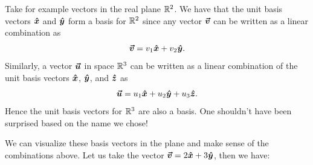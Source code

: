         Take for example vectors in the real plane $\mathbb{R}^2$.  We have that the unit basis vectors $\boldsymbol{\hat{x}}$ and $\boldsymbol{\hat{y}}$ form a basis for $\mathbb{R}^2$ since any vector $\boldsymbol{\boldsymbol{\vec{v}}}$ can be written as a linear combination as 
        \[
        \boldsymbol{\boldsymbol{\vec{v}}} = v_1 \boldsymbol{\hat{x}} + v_2\boldsymbol{\hat{y}}.
        \]
        Similarly, a vector $\boldsymbol{\boldsymbol{\vec{u}}}$ in space $\mathbb{R}^3$ can be written as a linear combination of the unit basis vectors $\boldsymbol{\hat{x}}$, $\boldsymbol{\hat{y}}$, and $\boldsymbol{\hat{z}}$ as
        \[
        \boldsymbol{\boldsymbol{\vec{u}}} = u_1 \boldsymbol{\hat{x}} + u_2 \boldsymbol{\hat{y}} + u_3 \boldsymbol{\hat{z}}.
        \]
        Hence the unit basis vectors for $\mathbb{R}^3$ are also a basis.  One shouldn't have been surprised based on the name we chose!
        
        We can visualize these basis vectors in the plane and make sense of the combinations above. Let us take the vector $\boldsymbol{\boldsymbol{\vec{v}}} = 2\boldsymbol{\hat{x}} + 3\boldsymbol{\hat{y}}$, then we have:
        \begin{center}
        \end{center}
        

